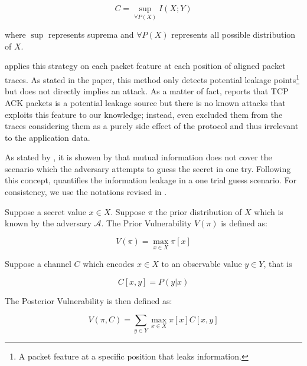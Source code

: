 \begin{equation} \label{Eq: Capacity}
	C = \sup_{\forall P(X)}{I(X;Y)}
\end{equation}

where $\sup$ represents suprema and $\forall P(X)$ represents all possible distribution of $X$.

\cite{PinpointWeb} applies this strategy on each packet feature at each position of aligned packet traces. As stated in the paper, this method only detects potential leakage points\footnote{A packet feature at a specific position that leaks information.} but does not directly implies an attack. As a matter of fact, \cite{PinpointWeb} reports that TCP ACK packets is a potential leakage source but there is no known attacks that exploits this feature to our knowledge; instead, \cite{PClassifier} even excluded them from the traces considering them as a purely side effect of the protocol and thus irrelevant to the application data.

As stated by \cite{OneTryGuess}, it is showen by \cite{OneTryGuessOrigin} that mutual information does not cover the scenario which the adversary attempts to guess the secret in one try. Following this concept, \cite{OneTryGuess} quantifies the information leakage in a one trial guess scenario. For consistency, we use the notations revised in \cite{GLeakage}. 

\begin{definition}
	Suppose a secret value $x \in X$. Suppose $\pi$ the prior distribution of $X$ which is known by the adversary $\mathcal{A}$. The Prior Vulnerability $V(\pi)$ is defined as:
	
	\begin{equation}
		V(\pi) = \max_{x \in X}{\pi[x]}
	\end{equation}
	
	Suppose a channel $C$ which encodes $x \in X$ to an observable value $y \in Y$, that is
	
	\begin{equation}
		C[x,y] = P(y | x)
	\end{equation}
	
	The Posterior Vulnerability is then defined as:
	
	\begin{equation}
		V(\pi, C) = \sum_{y \in Y}{\max_{x \in X}{\pi[x]C[x,y]}} 
	\end{equation}
	
\end{definition}

